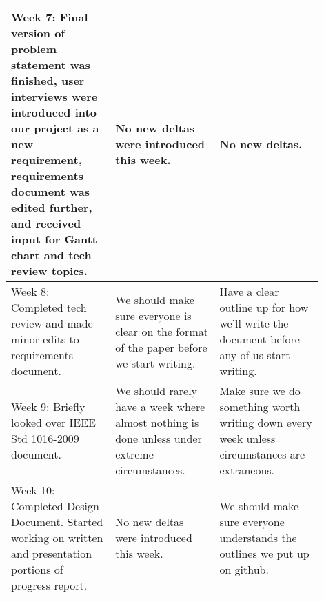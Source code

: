 \documentclass[10pt,journal,compsoc,draftclsnofoot]{IEEEtran}
\begin{document}
\begin{flushleft}
\begin{center}
\begin{table}[H]
\begin{tabular}{ | p{0.3\linewidth} | p{0.3\linewidth} | p{0.3\linewidth} | }
Week 7: Final version of problem statement was finished, user interviews were introduced into our project as a new requirement, requirements document was edited further, and received input for Gantt chart and tech review topics. &  
No new deltas were introduced this week. & 
No new deltas. \\ \hline

Week 8: Completed tech review and made minor edits to requirements document. & 
We should make sure everyone is clear on the format of the paper before we start writing. &
Have a clear outline up for how we'll write the document before any of us start writing. \\ \hline

Week 9: Briefly looked over IEEE Std 1016-2009 document. &
We should rarely have a week where almost nothing is done unless under extreme circumstances. &
Make sure we do something worth writing down every week unless circumstances are extraneous. \\ \hline

Week 10: Completed Design Document. Started working on written and presentation portions of progress report. &
No new deltas were introduced this week. &
We should make sure everyone understands the outlines we put up on github. \\ \hline

\end{tabular}
\newline
\label{table:retro}
\end{table}
\end{center}




\end{flushleft}
\end{document}
